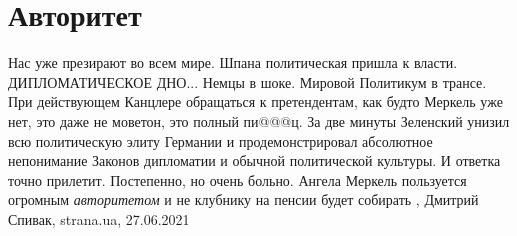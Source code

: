  
 
 
 
 
\chapter{Авторитет}
\label{sec:slova.avtoritet}

Нас уже презирают во всем мире. Шпана политическая пришла к власти.
ДИПЛОМАТИЧЕСКОЕ ДНО...  Немцы в шоке. Мировой Политикум в трансе. При
действующем Канцлере обращаться к претендентам, как будто Меркель уже нет, это
даже не моветон, это полный пи@@@ц.  За две минуты Зеленский унизил всю
политическую элиту Германии и продемонстрировал абсолютное непонимание Законов
дипломатии и обычной политической культуры.  И ответка точно прилетит.
Постепенно, но очень больно. Ангела Меркель пользуется огромным
\emph{авторитетом} и не клубнику на пенсии будет собирать
, 
Дмитрий Спивак, strana.ua, 27.06.2021
